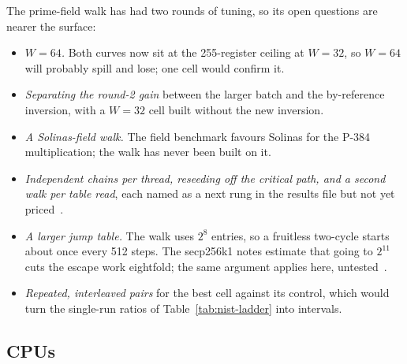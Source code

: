 The prime-field walk has had two rounds of tuning, so its open
questions are nearer the surface:
\begin{itemize}[leftmargin=1.2em,itemsep=0.2em]
\item \emph{$W=64$.} Both curves now sit at the 255-register ceiling at
  $W=32$, so $W=64$ will probably spill and lose; one cell would
  confirm it.
\item \emph{Separating the round-2 gain} between the larger batch and the
  by-reference inversion, with a $W=32$ cell built without the new
  inversion.
\item \emph{A Solinas-field walk.} The field benchmark favours Solinas
  for the P-384 multiplication; the walk has never been built on it.
\item \emph{Independent chains per thread, reseeding off the critical
  path, and a second walk per table read}, each named as a next rung
  in the results file but not yet priced~.
\item \emph{A larger jump table.} The walk uses $2^8$ entries, so a
  fruitless two-cycle starts about once every 512 steps. The secp256k1
  notes estimate that going to $2^{11}$ cuts the escape work eightfold;
  the same argument applies here, untested~.
\item \emph{Repeated, interleaved pairs} for the best cell against its
  control, which would turn the single-run ratios of
  Table~\ref{tab:nist-ladder} into intervals.
\end{itemize}

\subsection{CPUs}
\label{sec:open-cpu}

